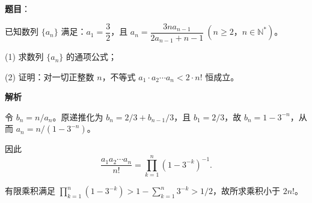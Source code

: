 \begin{answer}

\textbf{题目}：

已知数列 $\{a_n\}$ 满足：$a_1=\dfrac32$，且 $a_n=\dfrac{3na_{n-1}}{2a_{n-1}+n-1}\ (n\geqslant2\text{，}n\in\mathbb N^*)$。

(1) 求数列 $\{a_n\}$ 的通项公式；

(2) 证明：对一切正整数 $n$，不等式 $a_1\cdot a_2\cdots a_n<2\cdot n!$ 恒成立。

\textbf{解析}


令 $b_n=n/a_n$。原递推化为 $b_n=2/3+b_{n-1}/3$，且 $b_1=2/3$，故 $b_n=1-3^{-n}$，从而 $a_n=n/(1-3^{-n})$。


因此
\nopagebreak[4]
\[
\frac{a_1a_2\cdots a_n}{n!}=\prod_{k=1}^n(1-3^{-k})^{-1}.
\]

有限乘积满足 $\prod_{k=1}^n(1-3^{-k})>1-\sum_{k=1}^n3^{-k}>1/2$，故所求乘积小于 $2n!$。



\end{answer}